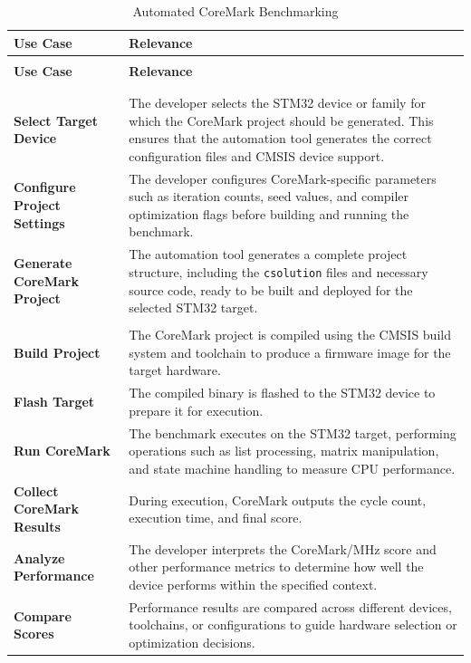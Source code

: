 \begin{xltabular}{\linewidth}{@{}>{\bfseries}l X@{}}
	\caption{Automated CoreMark Benchmarking\label{tab:use_cases}} \\
	\toprule
	\textbf{Use Case} & \textbf{Relevance} \\
	\midrule
	\endfirsthead %

	 \\
	\toprule
	\textbf{Use Case} & \textbf{Relevance} \\
	\midrule
	\endhead %

	\midrule
	 \\
	\endfoot %

	\bottomrule
	\endlastfoot %

	 \\
	\midrule
	Select Target Device &
	The developer selects the STM32 device or family for which the CoreMark project should be generated.
	This ensures that the automation tool generates the correct configuration files and CMSIS device support. \\
	\midrule
	Configure Project Settings &
	The developer configures CoreMark-specific parameters such as iteration counts, seed values, and compiler optimization flags
	before building and running the benchmark. \\
	\midrule
	Generate CoreMark Project &
	The automation tool generates a complete project structure, including the \texttt{csolution} files and necessary source code,
	ready to be built and deployed for the selected STM32 target. \\
	\midrule
	 \\
	\midrule
	Build Project &
	The CoreMark project is compiled using the CMSIS build system and toolchain to produce a firmware image for the target hardware. \\
	\midrule
	Flash Target &
	The compiled binary is flashed to the STM32 device to prepare it for execution.\\
	\midrule
	Run CoreMark &
	The benchmark executes on the STM32 target, performing operations such as list processing, matrix manipulation, and state machine handling
	to measure CPU performance. \\
	\midrule
	Collect CoreMark Results &
	During execution, CoreMark outputs the cycle count, execution time, and final score. \\
	\midrule
	Analyze Performance &
	The developer interprets the CoreMark/MHz score and other performance metrics to determine how well the device performs within the specified context. \\
	\midrule
	Compare Scores &
	Performance results are compared across different devices, toolchains, or configurations to guide hardware selection or optimization decisions.
\end{xltabular}

